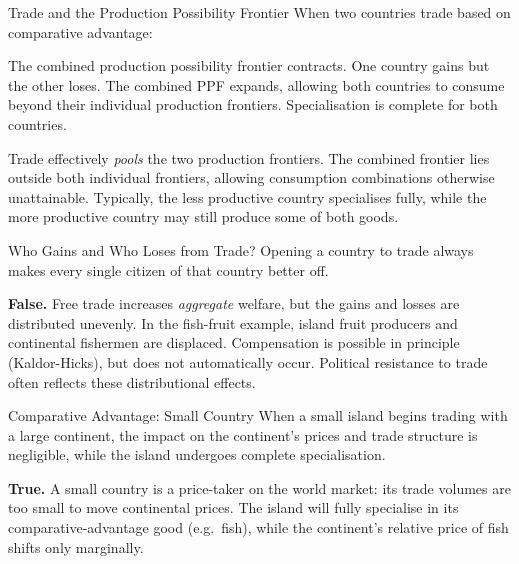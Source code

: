 \documentclass[paper=a5]{scrartcl}
\begin{document}
\begin{question}[type=mc]{Trade and the Production Possibility Frontier}
When two countries trade based on comparative advantage:
\begin{choices}
  \choice        The combined production possibility frontier contracts.
  \choice        One country gains but the other loses.
  \correctchoice The combined PPF expands, allowing both countries to
                 consume beyond their individual production frontiers.
  \choice        Specialisation is complete for both countries.
\end{choices}
\begin{solution}
  Trade effectively \emph{pools} the two production frontiers. The combined
  frontier lies outside both individual frontiers, allowing consumption
  combinations otherwise unattainable. Typically, the less productive country
  specialises fully, while the more productive country may still produce some
  of both goods.
\end{solution}
\end{question}

\begin{question}[type=tf]{Who Gains and Who Loses from Trade?}
Opening a country to trade always makes every single citizen of that country
better off.
\truefalse[false]
\begin{solution}
  \textbf{False.} Free trade increases \emph{aggregate} welfare, but the gains
  and losses are distributed unevenly. In the fish-fruit example, island fruit
  producers and continental fishermen are displaced. Compensation is possible
  in principle (Kaldor-Hicks), but does not automatically occur. Political
  resistance to trade often reflects these distributional effects.
\end{solution}
\end{question}

\begin{question}[type=tf]{Comparative Advantage: Small Country}
When a small island begins trading with a large continent, the impact on the
continent's prices and trade structure is negligible, while the island
undergoes complete specialisation.
\truefalse[true]
\begin{solution}
  \textbf{True.} A small country is a price-taker on the world market: its
  trade volumes are too small to move continental prices. The island will
  fully specialise in its comparative-advantage good (e.g.\ fish), while the
  continent's relative price of fish shifts only marginally.
\end{solution}
\end{question}
\end{document}
